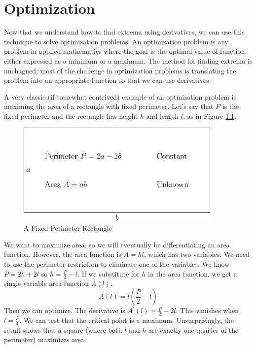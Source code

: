 \documentclass[fleqn]{report}
\begin{document}
\chapter{Optimization}
\label{Optimization}

Now that we understand how to find extrema using derivatives,
we can use this technique to solve optimization problems.  An
optimization problem is any problem in applied mathematics
where the goal is the optimal value of function, either
expressed as a minimum or a maximum. The method for finding
extrema is unchagned; most of the challenge in optimization
problems is translating the problem into an appropriate
function so that we can use derivatives.

\begin{example}
A very classic (if somewhat contrived) example of an
optmization problem is maximing the area of a rectangle with
fixed perimeter. Let's say that $P$ is the fixed perimeter and
the rectangle has height $h$ and length $l$, as in Figure
\ref{A Fixed-Perimeter Rectangle}.

\begin{figure}[ht]
\centering
\includegraphics[width=10cm]{figure56.eps}
\caption{A Fixed-Perimeter Rectangle}
\label{A Fixed-Perimeter Rectangle}
\end{figure}
\clearpage

We want to maximize area, so we will eventually be
differentiating an area function. However, the area function
is $A = hl$, which has two variables. We need to
use the perimeter restriction to eliminate one of the
variables. We know $P = 2h + 2l$ so $h = \frac{P}{2} - l$.
If we substitute for $h$ in the area function, we get a single
variable area function $A(l)$.
\begin{equation*}
A(l) = l \left( \frac{P}{2} - l \right)
\end{equation*}
Then we can optimize. The derivative is $A^\prime(l) =
\frac{P}{2} - 2l$. This vanishes when $l = \frac{P}{4}$. We
can test that the critical point is a maximum. Unsurprisingly,
the result shows that a square (where both $l$ and $h$ are
exactly one quarter of the perimeter) maximizes area.
\end{example}
\end{document}
